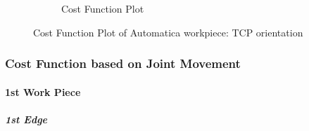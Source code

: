 \begin{figure}[!htbp]
\begin{subfigure}[b]{0.4\textwidth}
		\caption{Cost Function Plot}  
		\label{fig:cp4a}
	\end{subfigure}	
	\caption{Cost Function Plot of Automatica workpiece: TCP orientation}
	\label{fig:cp4}
\end{figure}


\subsubsection{Cost Function based on Joint Movement}

\paragraph{1st Work Piece}
\subparagraph{1st Edge}

